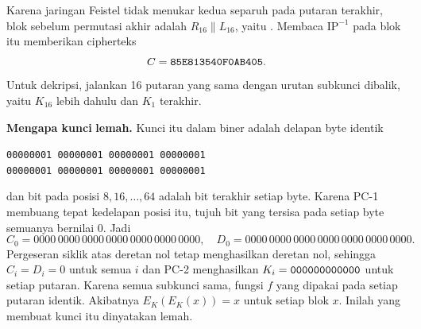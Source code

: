 \begin{example}
Karena jaringan Feistel tidak menukar kedua separuh pada putaran terakhir,
blok sebelum permutasi akhir adalah $R_{16} \parallel L_{16}$, yaitu
. Membaca $\text{IP}^{-1}$ pada blok itu memberikan
cipherteks
\[
C = \texttt{85E813540F0AB405}.
\]
Untuk dekripsi, jalankan 16 putaran yang sama dengan urutan subkunci dibalik,
yaitu $K_{16}$ lebih dahulu dan $K_1$ terakhir.
\end{example}

\begin{example}
\label{ex:des-kunci-lemah}
\textbf{Mengapa kunci}  \textbf{lemah.} Kunci itu dalam
biner adalah delapan byte identik
\begin{center}
\texttt{00000001\ 00000001\ 00000001\ 00000001}\\
\texttt{00000001\ 00000001\ 00000001\ 00000001}
\end{center}
dan bit pada posisi $8, 16, \dots, 64$ adalah bit terakhir setiap byte.
Karena PC-1 membuang tepat kedelapan posisi itu, tujuh bit yang tersisa pada
setiap byte semuanya bernilai $0$. Jadi
\[
C_0 = 0000\,0000\,0000\,0000\,0000\,0000\,0000, \quad
D_0 = 0000\,0000\,0000\,0000\,0000\,0000\,0000.
\]
Pergeseran siklik atas deretan nol tetap menghasilkan deretan nol, sehingga
$C_i = D_i = 0$ untuk semua $i$ dan PC-2 menghasilkan
$K_i = \texttt{000000000000}$ untuk setiap putaran. Karena semua subkunci sama,
fungsi $f$ yang dipakai pada setiap putaran identik. Akibatnya
$E_K(E_K(x)) = x$ untuk setiap blok $x$. Inilah yang membuat kunci itu
dinyatakan lemah.
\end{example}
